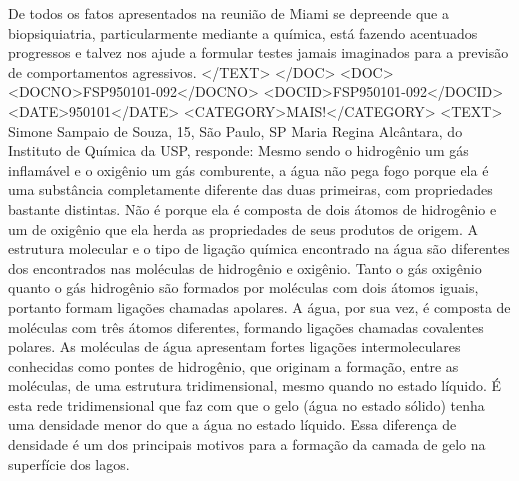 De todos os fatos apresentados na reunião de Miami se depreende que a biopsiquiatria, particularmente mediante a química, está fazendo acentuados progressos e talvez nos ajude a formular testes jamais imaginados para a previsão de comportamentos agressivos.
</TEXT>
</DOC>
<DOC>
<DOCNO>FSP950101-092</DOCNO>
<DOCID>FSP950101-092</DOCID>
<DATE>950101</DATE>
<CATEGORY>MAIS!</CATEGORY>
<TEXT>
Simone Sampaio de Souza, 15, São Paulo, SP
Maria Regina Alcântara, do Instituto de Química da USP, responde:
Mesmo sendo o hidrogênio um gás inflamável e o oxigênio um gás comburente, a água não pega fogo porque ela é uma substância completamente diferente das duas primeiras, com propriedades bastante distintas.
Não é porque ela é composta de dois átomos de hidrogênio e um de oxigênio que ela  herda as propriedades de seus produtos de origem. A estrutura molecular e o tipo de ligação química encontrado na água são diferentes dos encontrados nas moléculas de hidrogênio e oxigênio.
Tanto o gás oxigênio quanto o gás hidrogênio são formados por moléculas com dois átomos iguais, portanto formam ligações chamadas apolares. A água, por sua vez, é composta de moléculas com três átomos diferentes, formando ligações chamadas covalentes polares.
As moléculas de água apresentam fortes ligações intermoleculares conhecidas como pontes de hidrogênio, que originam a formação, entre as moléculas, de uma estrutura tridimensional, mesmo quando no estado líquido.
É esta rede tridimensional que faz com que o gelo (água no estado sólido) tenha uma densidade menor do que a água no estado líquido.
Essa diferença de densidade é um dos principais motivos para a formação da camada de gelo na superfície dos lagos.

